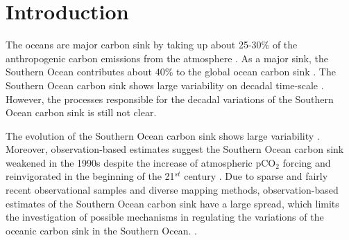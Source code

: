 \documentclass[12pt]{article}
\begin{document}
\newpage

\section{Introduction}


The oceans are major carbon sink by taking up about 25-30\% of the anthropogenic carbon emissions from the atmosphere \citep{Quere2016}. As a major sink, the Southern Ocean contributes about 40\% to the global ocean carbon sink \citep{Sabine2004}. The Southern Ocean carbon sink shows large variability on decadal time-scale \citep{landschuetzer2015}. However, the processes responsible for the decadal variations of the Southern Ocean carbon sink is still not clear.


The evolution of the Southern Ocean carbon sink shows large variability \citep{landschuetzer2015}. Moreover, observation-based estimates suggest the  Southern Ocean carbon sink weakened in the 1990s despite the increase of atmospheric pCO$_2$ forcing and reinvigorated in the beginning of the 21$^{st}$ century \citep{LeQuere2007,landschuetzer2015}. Due to sparse and fairly recent observational samples and diverse mapping methods, observation-based estimates of the Southern Ocean carbon sink have a large spread, which limits the investigation of possible mechanisms in regulating the variations of the oceanic carbon sink in the Southern Ocean.  \citep{LeQuere2007,Roedenbeck2013,landschuetzer2015}. 


\end{document}
